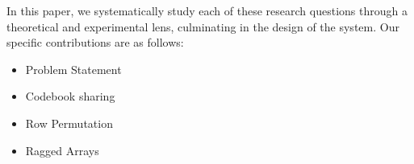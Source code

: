 In this paper, we systematically study each of these research questions through a theoretical and experimental lens, culminating in the design of the \sys system. Our specific contributions are as follows:

\begin{itemize}
\item Problem Statement

\item Codebook sharing

\item Row Permutation

\item Ragged Arrays
\end{itemize}
